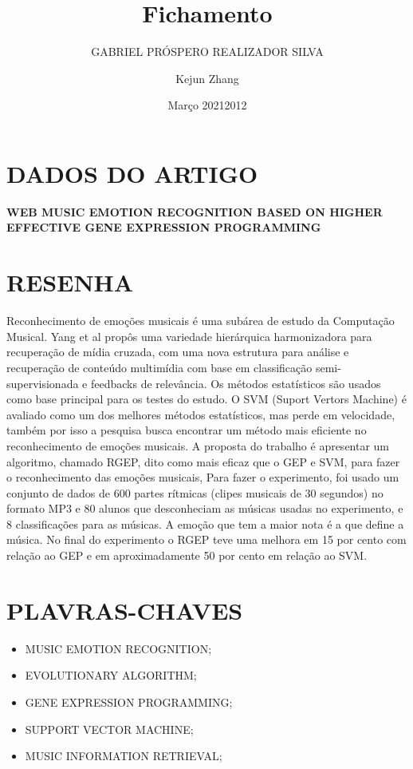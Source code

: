 \documentclass{article}
\title{Fichamento}
\author{GABRIEL PRÓSPERO REALIZADOR  SILVA}
\date{Março 2021}
\begin{document}
\maketitle

\section{DADOS DO ARTIGO}
\textbf{WEB MUSIC EMOTION RECOGNITION BASED ON HIGHER EFFECTIVE GENE EXPRESSION PROGRAMMING \\}
\author{Kejun Zhang\\}
\date{2012}

\section{RESENHA}
Reconhecimento de emoções musicais é uma subárea de estudo da Computação Musical. Yang et al propôs uma variedade hierárquica harmonizadora para recuperação de mídia cruzada, com uma nova estrutura para análise e recuperação de conteúdo multimídia com base em classificação semi-supervisionada e feedbacks de relevância. Os métodos estatísticos são usados como base principal para os testes do estudo. O SVM (Suport Vertors Machine) é avaliado como um dos melhores métodos estatísticos, mas perde em velocidade, também por isso a pesquisa busca encontrar um método mais eficiente no reconhecimento de emoções musicais. A proposta do trabalho é apresentar um algoritmo, chamado RGEP, dito como mais eficaz que o GEP e SVM, para fazer o reconhecimento das emoções musicais, Para fazer o experimento, foi usado um conjunto de dados de 600 partes rítmicas (clipes musicais de 30 segundos) no formato MP3 e 80 alunos que desconheciam as músicas usadas no experimento, e 8 classificações para as músicas. A emoção que tem a maior nota é a que define a música. No final do experimento o RGEP teve uma melhora em 15 por cento com relação ao GEP e em aproximadamente 50 por cento em relação ao SVM.

\section{PLAVRAS-CHAVES}
\begin{itemize}
    \item MUSIC EMOTION RECOGNITION; 
    \item EVOLUTIONARY ALGORITHM; 
    \item GENE EXPRESSION PROGRAMMING; 
    \item SUPPORT VECTOR MACHINE; 
    \item MUSIC INFORMATION RETRIEVAL;
\end{itemize}
\end{document}
